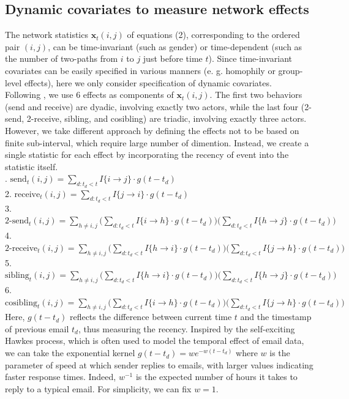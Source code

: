 \documentclass[a4paper]{article}
\begin{document}
\subsection{Dynamic covariates to measure network effects}
The network statistics $\boldsymbol{x}_t(i, j)$ of equations (2), corresponding to the ordered pair $(i, j)$, can be time-invariant (such as gender) or time-dependent (such as the number of two-paths from $i$ to $j$ just before time $t$). Since time-invariant covariates can be easily specified in various manners (e. g. homophily or group-level effects), here we only consider specification of dynamic covariates.\\ \newline
Following \cite{PerryWolfe2012}, we use 6 effects as components of $\boldsymbol{x}_t(i, j)$. The first two behaviors (send and receive) are dyadic, involving exactly two actors,
while the last four (2-send, 2-receive, sibling, and cosibling) are triadic, involving exactly three actors. However, we take different approach by defining the effects not to be based on finite sub-interval, which require large number of dimention. Instead, we create a single statistic for each effect by incorporating the recency of event into the statistic itself. \\ . $\mbox{send}_t(i, j)=\sum\limits_{d: t_d<t} I\{i\rightarrow j\}\cdot g(t-t_d)$\\
2. $\mbox{receive}_t(i, j)=\sum\limits_{d: t_d<t} I\{j\rightarrow i\}\cdot g(t-t_d)$\\
3. $\mbox{2-send}_t(i, j)=\sum\limits_{h \neq i, j}\Big(\sum\limits_{d: t_d<t}  I\{i\rightarrow h\}\cdot g(t-t_d)\Big)\Big(\sum\limits_{d: t_d<t} I\{h\rightarrow j\}\cdot g(t-t_d)\Big)$\\
4. $\mbox{2-receive}_t(i, j)=\sum\limits_{h \neq i, j}\Big(\sum\limits_{d: t_d<t} I\{h\rightarrow i\}\cdot g(t-t_d)\Big)\Big(\sum\limits_{d: t_d<t} I\{j\rightarrow h\}\cdot g(t-t_d)\Big)$\\
5. $\mbox{sibling}_t(i, j)=\sum\limits_{h \neq i, j}\Big(\sum\limits_{d: t_d<t} I\{h\rightarrow i\}\cdot g(t-t_d)\Big)\Big(\sum\limits_{d: t_d<t} I\{h\rightarrow j\}\cdot g(t-t_d)\Big)$\\
6. $\mbox{cosibling}_t(i, j)=\sum\limits_{h \neq i, j}\Big(\sum\limits_{d: t_d<t} I\{i\rightarrow h\}\cdot g(t-t_d)\Big)\Big(\sum\limits_{d: t_d<t} I\{j\rightarrow h\}\cdot g(t-t_d)\Big)$\\\newline
Here, $g(t-t_d)$ reflects the difference between current time $t$ and the timestamp of previous email $t_d$, thus measuring the recency. Inspired by the self-exciting Hawkes process, which is often used to model the temporal effect of email data, we can take the exponential kernel $g(t-t_d)=we^{-w(t-t_d)}$ where $w$ is the parameter of speed at
which sender replies to emails, with larger values indicating faster response times. Indeed, $w^{-1}$ is the expected number of hours it takes to reply to a typical email. For simplicity, we can fix $w=1$.
\end{document}
